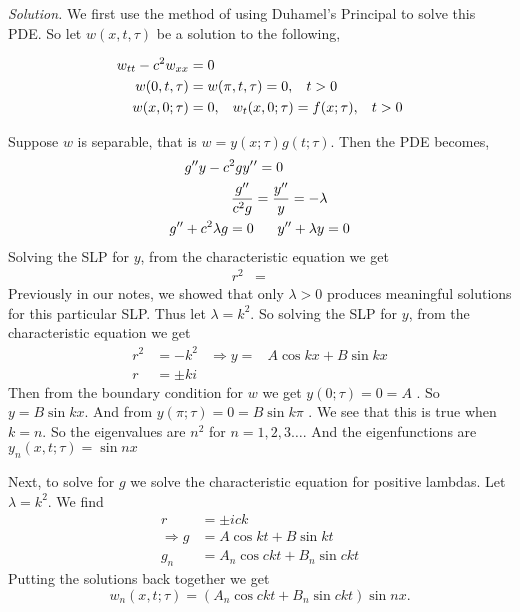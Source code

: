 \documentclass{article}
\begin{document}
\vspace{3mm}
\textit{Solution.} We first use the method of using Duhamel's Principal to solve this PDE. So let \(w(x,t,\tau)\) be a solution to the following,

\begin{align*}
w_{tt}-c^2w_{xx} &= 0\\
w(0,t,\tau)&= w(\pi,t,\tau)=0, \hspace{3mm} t>0  \\
w(x,0;\tau) &=0, \hspace{3mm} w_t(x,0;\tau)=f(x;\tau), \hspace{3mm} t>0
\end{align*}


Suppose \(w\) is separable, that is \( w= y(x;\tau)g(t;\tau) \). Then the PDE becomes, 
\begin{align*}
g''y-c^2gy'&'=0 \\
\frac{g''}{c^2g} &=  \frac{y''}{y}=-\lambda  \\
g''+c^2\lambda g= 0&  \hspace{6mm}  y''+\lambda y = 0
\end{align*}
Solving the SLP for \(y\), from the characteristic equation we get
\begin{align*}
r^2 &=    &     & 
\end{align*}
Previously in our notes, we showed that only \(\lambda >0\) produces meaningful solutions for this particular SLP. Thus let \(\lambda=k^2 \). So solving the SLP for \(y\), from the characteristic equation we get
\begin{align*}
r^2 &= -k^2   & \Rightarrow    y=&A\cos kx + B\sin kx  \\
r&= \pm k i & & 
\end{align*}
Then from the boundary condition for \(w\) we get \( y(0;\tau)=0 =A\) . So \(y=B\sin kx\). And from \(y(\pi;\tau)=0 = B\sin k\pi\) . We see that this is true when \(k= n\). So the eigenvalues are \(n^2\) for \(n=1,2,3\ldots\). And the eigenfunctions are \(y_n(x,t;\tau)= \sin nx \) 

Next, to solve for \(g\) we solve the characteristic equation for positive lambdas. Let \(\lambda = k^2\). We find 
\begin{align*}
r&= \pm ick  \\
\Rightarrow g&= A\cos kt + B\sin kt \\
g_n&= A_n\cos ckt + B_n \sin ckt 
\end{align*}
Putting the solutions back together we get 
\[w_n(x,t;\tau) = (A_n\cos ckt + B_n \sin ckt)\sin nx.   \]
\end{document}
